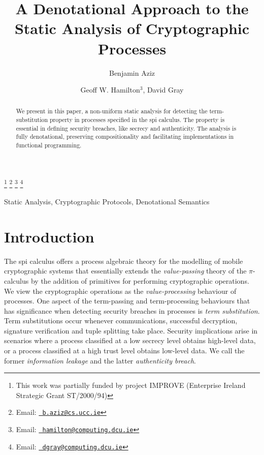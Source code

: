 \documentclass{entcs} \usepackage{entcsmacro}
\begin{document}

\begin{frontmatter}
  \title{A Denotational Approach to the Static Analysis of Cryptographic Processes} \author{Benjamin Aziz}
  \address{Computer Science Department\\ University College Cork\\
    Cork, Ireland} \author{Geoff W. Hamilton$^{3}${}, David Gray}
  \address{School of Computing\\Dublin City University\\
    Dublin, Ireland} \thanks[ALL]{This work was partially funded by project IMPROVE (Enterprise Ireland Strategic Grant ST/2000/94)} \thanks[b.aziz@cs.ucc.ie]{Email:
    \href{mailto:b.aziz@cs.ucc.ie} {\texttt{\normalshape
        b.aziz@cs.ucc.ie}}} \thanks[hamilton@computing.dcu.ie]{Email:
    \href{mailto:hamilton@computing.dcu.ie} {\texttt{\normalshape
        hamilton@computing.dcu.ie}}} \thanks[dgray@computing.dcu.ie]{Email:
    \href{mailto:dgray@computing.dcu.ie} {\texttt{\normalshape
        dgray@computing.dcu.ie}}}
\begin{abstract} 
We present in this paper, a non-uniform static analysis for detecting the term-substitution property in processes specified in the spi calculus.  The property is essential in defining security breaches, like secrecy and authenticity.  The analysis is fully denotational, preserving compositionality and facilitating implementations in functional programming.
\end{abstract}
\begin{keyword}
  Static Analysis, Cryptographic Protocols, Denotational Semantics
\end{keyword}
\end{frontmatter}
\section{Introduction}
The spi calculus \cite{abadi1} offers a process algebraic theory for the modelling of mobile cryptographic systems that essentially extends the {\itshape value-passing\/} theory of the $\pi$-calculus \cite{milner1} by the addition of primitives for performing cryptographic operations. We view the cryptographic operations as the {\itshape value-processing\/} behaviour of processes. One aspect of the term-passing and term-processing behaviours that has significance when detecting security breaches in processes is {\itshape term substitution\/}. Term substitutions occur whenever communications, successful decryption, signature verification and tuple splitting take place.  Security implications arise in scenarios where a process classified at a low secrecy level obtains high-level data, or a process classified at a high trust level obtains low-level data.  We call the former {\itshape information leakage\/} and the latter {\itshape authenticity breach\/}.
\end{document}
